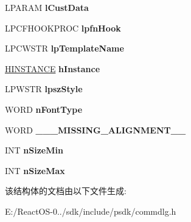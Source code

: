 \begin{DoxyCompactItemize}
L\+P\+A\+R\+AM {\bfseries l\+Cust\+Data}
\item 
\mbox{\label{structtag_c_h_o_o_s_e_f_o_n_t_w_a564a391abdbefcad76fbcdfa5a3b0738}} 
L\+P\+C\+F\+H\+O\+O\+K\+P\+R\+OC {\bfseries lpfn\+Hook}
\item 
\mbox{\label{structtag_c_h_o_o_s_e_f_o_n_t_w_aca4db797ce1b12c7ac487ce4e8654f59}} 
L\+P\+C\+W\+S\+TR {\bfseries lp\+Template\+Name}
\item 
\mbox{\label{structtag_c_h_o_o_s_e_f_o_n_t_w_a0a73705e2d87e4869ece8828e95fc004}} 
\hyperlink{interfacevoid}{H\+I\+N\+S\+T\+A\+N\+CE} {\bfseries h\+Instance}
\item 
\mbox{\label{structtag_c_h_o_o_s_e_f_o_n_t_w_a0aae32c511add5a3270554ae3fb4c861}} 
L\+P\+W\+S\+TR {\bfseries lpsz\+Style}
\item 
\mbox{\label{structtag_c_h_o_o_s_e_f_o_n_t_w_afd79ea5b05f0b1255830dae915353f2d}} 
W\+O\+RD {\bfseries n\+Font\+Type}
\item 
\mbox{\label{structtag_c_h_o_o_s_e_f_o_n_t_w_a281df724161c391cc221a66b49041059}} 
W\+O\+RD {\bfseries \+\_\+\+\_\+\+\_\+\+M\+I\+S\+S\+I\+N\+G\+\_\+\+A\+L\+I\+G\+N\+M\+E\+N\+T\+\_\+\+\_\+}
\item 
\mbox{\label{structtag_c_h_o_o_s_e_f_o_n_t_w_a4418f25f6dc4506e5f21f19f04194889}} 
I\+NT {\bfseries n\+Size\+Min}
\item 
\mbox{\label{structtag_c_h_o_o_s_e_f_o_n_t_w_ab3c33c3e91813947348fa16674357abf}} 
I\+NT {\bfseries n\+Size\+Max}
\end{DoxyCompactItemize}


该结构体的文档由以下文件生成\+:\begin{DoxyCompactItemize}
\item 
E\+:/\+React\+O\+S-\/0../sdk/include/psdk/commdlg.\+h\end{DoxyCompactItemize}
